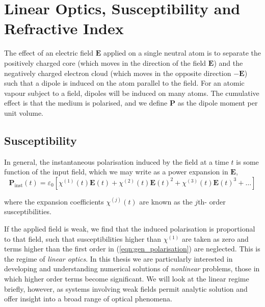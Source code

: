 \section{Linear Optics, Susceptibility and Refractive Index}
  \label{sec:propagation_susc}


  The effect of an electric field $\mathbf{E}$ applied on a single neutral atom
  is to separate the positively charged core (which moves in the direction of
  the field $\mathbf{E}$) and the negatively charged electron cloud (which moves
  in the opposite direction $-\mathbf{E}$) such that a dipole is induced on the
  atom parallel to the field. For an atomic vapour subject to a field, dipoles
  will be induced on many atoms. The cumulative effect is that the medium is
  polarised, and we define $\mathbf{P}$ as the dipole moment per unit volume.

  \subsection{Susceptibility}

    In general, the instantaneous polarisation induced by the field at a time
    $t$ is some function of the input field, which we may write as a power
    expansion\cite{boyd2008nonlinear} in $\mathbf{E}$,
    \begin{equation}\label{eqn:gen_polarisation}
      \mathbf{P}_{\mathrm{inst}}(t) = \varepsilon_0 \left
          [ \chi^{(1)}(t) \mathbf{E}(t) +  
      \chi^{(2)}(t) \mathbf{E}(t)^2 + 
      \chi^{(3)}(t) \mathbf{E}(t)^3 + \dots \right]
    \end{equation}

    where the expansion coefficients $\chi^{(j)}(t)$ are known as the $j$th-
    order susceptibilities.

    If the applied field is weak, we find that the induced polarisation is
    proportional to that field, such that susceptibilities higher than
    $\chi^{(1)}$ are taken as zero and terms higher than the first order in
    (\ref{eqn:gen_polarisation}) are neglected. This is the regime of
    \textit{linear optics}. In this thesis we are particularly interested in
    developing and understanding numerical solutions of \textit{nonlinear}
    problems, \ie those in which higher order terms become significant. We will
    look at the linear regime briefly, however, as systems involving weak fields
    permit analytic solution and offer insight into a broad range of optical
    phenomena.

